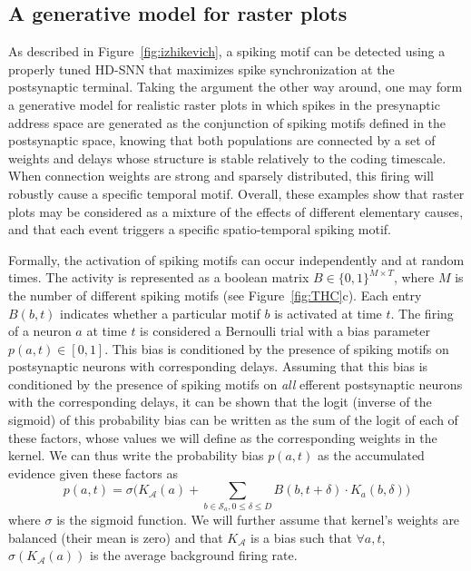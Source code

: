 \documentclass[runningheads]{llncs}
\newcommand{\presynaddr}{a} %
\newcommand{\postsynaddr}{b} %
\newcommand{\presynaddrspace}{\mathcal{A}} %
\newcommand{\synapse}{\mathcal{S}} %
\newcommand{\synapticdelay}{\delta} %
\newcommand{\kernel}{K} %
\begin{document}
\subsection{A generative model for raster plots}

As described in Figure~\ref{fig:izhikevich}, a spiking motif can be detected using a properly tuned HD-SNN that maximizes spike synchronization at the postsynaptic terminal. Taking the argument the other way around, one may form a generative model for realistic raster plots in which spikes in the presynaptic address space are generated as the conjunction of spiking motifs defined in the postsynaptic space, knowing that both populations are connected by a set of weights and delays whose structure is stable relatively to the coding timescale. When connection weights are strong and sparsely distributed, this firing will robustly cause a specific temporal motif. Overall, these examples show that raster plots may be considered as a mixture of the effects of different elementary causes, and that each event triggers a specific spatio-temporal spiking motif. 

Formally, the activation of spiking motifs can occur independently and at random times. The activity is represented as a boolean matrix $B\in \{0, 1\}^{M\times T}$, where $M$ is the number of different spiking motifs (see Figure~\ref{fig:THC}c). Each entry $B(\postsynaddr, t)$ indicates whether a particular motif $\postsynaddr$ is activated at time $t$. The firing of a neuron $\presynaddr$ at time $t$ is considered a Bernoulli trial with a bias parameter $p(\presynaddr, t) \in [0, 1]$. This bias is conditioned by the presence of spiking motifs on postsynaptic neurons with corresponding delays. 
Assuming that this bias is conditioned by the presence of spiking motifs on \emph{all} efferent postsynaptic neurons with the corresponding delays, it can be shown that the logit (inverse of the sigmoid) of this probability bias can be written as the sum of the logit of each of these factors, whose values we will define as the corresponding weights in the kernel. We can thus write the probability bias $p(a, t)$ as the accumulated evidence given these factors as 
\begin{equation*}
p(\presynaddr, t) = \sigma\big(\kernel_\presynaddrspace(\presynaddr) + \sum_{\postsynaddr \in \synapse_\presynaddr, 0 \le \synapticdelay \le D} B(\postsynaddr, t+\synapticdelay) \cdot  \kernel_\presynaddr(\postsynaddr, \synapticdelay)  \big)  
\end{equation*}
where $\sigma$ is the sigmoid function. We will further assume that kernel's weights are balanced (their mean is zero) and that $\kernel_\presynaddrspace$ is a bias such that $\forall \presynaddr, t$, $\sigma(\kernel_\presynaddrspace(\presynaddr))$ is the average background firing rate. 
\end{document}
